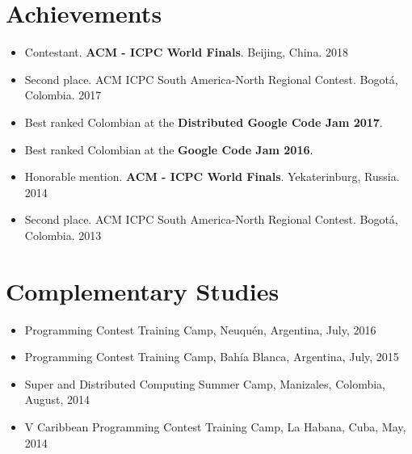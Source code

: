 \documentclass[11pt,a4paper,sans]{moderncv}        %
\begin{document}
\section{Achievements}

\begin{itemize}
  \item{Contestant. \textbf{ACM - ICPC World Finals}. Beijing, China. 2018}
  \item{Second place. ACM ICPC South America-North Regional Contest. Bogotá, Colombia. 2017} %
  \item{Best ranked Colombian at the \textbf{Distributed Google Code Jam 2017}}. %
  \item{Best ranked Colombian at the \textbf{Google Code Jam 2016}}. %
  \item{Honorable mention. \textbf{ACM - ICPC World Finals}. Yekaterinburg, Russia. 2014}
  \item{Second place. ACM ICPC South America-North Regional Contest. Bogotá, Colombia. 2013}
\end{itemize}

\section{Complementary Studies}
\begin{itemize}
  \item{Programming Contest Training Camp, Neuquén, Argentina, July, 2016}
  \item{Programming Contest Training Camp, Bahía Blanca, Argentina, July, 2015}
  \item{Super and Distributed Computing Summer Camp,  Manizales, Colombia, August, 2014}
  \item{V Caribbean Programming Contest Training Camp, La Habana, Cuba, May, 2014}
\end{itemize}
\end{document}
